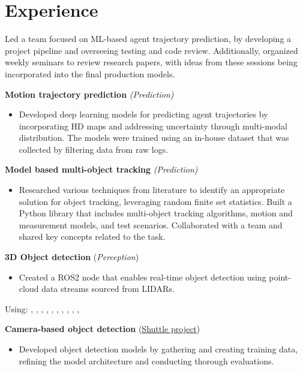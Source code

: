 \section*{\sectionformat Experience}
% 

Led a team focused on ML-based agent trajectory prediction, by developing a project pipeline and overseeing testing and code review. Additionally, organized weekly seminars to review research papers, with ideas from these sessions being incorporated into the final production models.

\textbf{Motion trajectory prediction} \textit{(Prediction)}
\begin{itemize}
    \item Developed deep learning models for predicting agent trajectories by incorporating HD maps and addressing uncertainty through multi-modal distribution. The models were trained using an in-house dataset that was collected by filtering data from raw logs.
\end{itemize}

\textbf{Model based multi-object tracking} \textit{(Prediction)}
\begin{itemize}
    \item Researched various techniques from literature to identify an appropriate solution for object tracking, leveraging random finite set statistics. Built a Python library that includes multi-object tracking algorithms, motion and measurement models, and test scenarios. Collaborated with a team and shared key concepts related to the task.
\end{itemize}

\textbf{3D Object detection} (\textit{Perception})
\begin{itemize}
    \item Created a ROS2 node that enables real-time object detection using point-cloud data streams sourced from LIDARs.
\end{itemize}
Using: , , , , , , , , , , 
\horizontalline
% 

\textbf{Camera-based object detection} (\href{https://www.engadget.com/2016/08/28/yandex-teams-on-self-driving-shuttle-bus/}{Shuttle project})
\begin{itemize}
    \item Developed object detection models by gathering and creating training data, refining the model architecture and conducting thorough evaluations.
\end{itemize}

